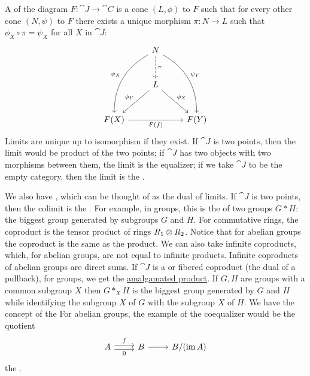 \documentclass[11pt, oneside]{article}
\DeclareMathOperator{\im}{im}
\begin{document}
A \href{https://en.wikipedia.org/wiki/Limit_(category_theory)}{} of the diagram $F:\cat J\longrightarrow\cat C$ is a cone $(L,\phi)$ to $F$ such that for every other cone $(N,\psi)$ to $F$ there exists a unique morphism $\pi:N\longrightarrow L$ such that $\phi_X \circ \pi = \psi_X$ for all $X$ in $\cat J$:
 \[
\begin{tikzcd}[row sep = large]
& N \arrow[d, "\pi", dashed] \arrow[ddr, bend left,"\psi_Y"]   \arrow[ddl, bend right,"\psi_X",swap] & \\
& L\arrow[dr, "\phi_X"]  \arrow[dl,swap, "\phi_Y"] & \\
 F(X) \arrow[rr,swap, "F(f)"] & &  F(Y) 
\end{tikzcd}
\]
Limits are unique up to isomorphism if they exist. If $\cat J$ is two points, then the limit would be product of the two points; if $\cat J$ has two objects with two morphisms between them, the limit is the equalizer; if we take $\cat J$ to be the empty category, then the limit is the \href{https://en.wikipedia.org/wiki/Initial_and_terminal_objects}{}.

We also have \href{https://en.wikipedia.org/wiki/Limit_(category_theory)}{}, which can be thought of as the dual of limits. If $\cat J$ is two points, then the colimit is the \href{https://en.wikipedia.org/wiki/Coproduct}{}. For example, in groups, this is the \href{https://en.wikipedia.org/wiki/Free_product}{} of two groups $G*H$: the biggest group generated by subgroups $G$ and $H$. For commutative rings, the coproduct is the tensor product of rings $R_1\otimes R_2$. Notice that for abelian groups the coproduct is the same as the product. We can also take infinite coproducts, which, for abelian groups, are not equal to infinite products. Infinite coproducts of abelian groups are direct sums. If $\cat J$ is a \href{https://en.wikipedia.org/wiki/Pushout_(category_theory)}{} or fibered coproduct (the dual of a pullback), for groups, we get the \href{https://en.wikipedia.org/wiki/Free_product#Generalization:_Free_product_with_amalgamation}{\color{black}amalgamated product}. If $G,H$ are groups with a common subgroup $X$ then $G*_X H$ is the biggest group generated by $G$ and $H$ while identifying the subgroup $X$ of $G$ with the subgroup $X$ of $H$. We have the concept of the \href{https://en.wikipedia.org/wiki/Coequalizer}{} For abelian groups, the example of the coequalizer would be the quotient
\[
\begin{tikzcd}
A \arrow[r, shift left, "f"]\arrow[r, shift right, swap, "0"]& B\arrow[r] & B/(\im A)
\end{tikzcd}
\] 
the \href{https://en.wikipedia.org/wiki/Cokernel}{}.
\end{document}
